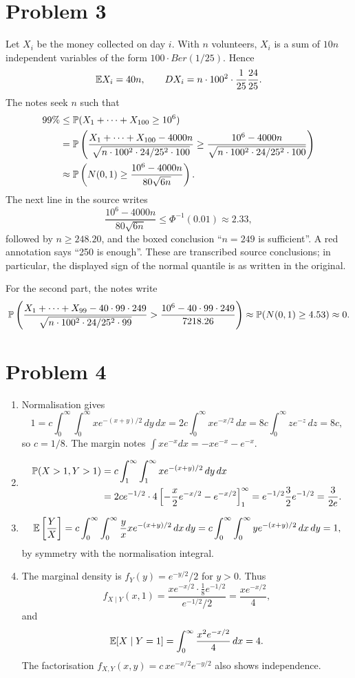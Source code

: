 \documentclass[a4paper]{article}
\begin{document}
\section*{Problem 3}
Let $X_i$ be the money collected on day $i$. With $n$ volunteers, $X_i$ is a sum of $10n$ independent variables of the form $100\cdot Ber(1/25)$. Hence
\[\E X_i=40n,\qquad DX_i=n\cdot100^2\cdot\frac1{25}\frac{24}{25}.\]
The notes seek $n$ such that
\begin{align*}
99\%&\le\P(X_1+\cdots+X_{100}\ge10^6)\\
&=\P\left(\frac{X_1+\cdots+X_{100}-4000n}{\sqrt{n\cdot100^2\cdot24/25^2\cdot100}}\ge\frac{10^6-4000n}{\sqrt{n\cdot100^2\cdot24/25^2\cdot100}}\right)\\
&\approx\P\left(N(0,1)\ge\frac{10^6-4000n}{80\sqrt{6n}}\right).
\end{align*}
The next line in the source writes
\[\frac{10^6-4000n}{80\sqrt{6n}}\le\Phi^{-1}(0.01)\approx2.33,\]
followed by $n\ge248.20$, and the boxed conclusion ``$n=249$ is sufficient''. A red annotation says ``250 is enough''. These are transcribed source conclusions; in particular, the displayed sign of the normal quantile is as written in the original.

For the second part, the notes write
\[\P\left(\frac{X_1+\cdots+X_{99}-40\cdot99\cdot249}{\sqrt{n\cdot100^2\cdot24/25^2\cdot99}}>\frac{10^6-40\cdot99\cdot249}{7218.26}\right)\approx\P(N(0,1)\ge4.53)\approx0.\]
\section*{Problem 4}
\begin{enumerate}
\item Normalisation gives
\[1=c\int_0^\infty\int_0^\infty xe^{-(x+y)/2}\,dy\,dx
=2c\int_0^\infty xe^{-x/2}\,dx=8c\int_0^\infty ze^{-z}\,dz=8c,\]
so $c=1/8$. The margin notes $\int xe^{-x}dx=-xe^{-x}-e^{-x}$.
\item
\begin{align*}
\P(X>1,Y>1)&=c\int_1^\infty\int_1^\infty xe^{-(x+y)/2}\,dy\,dx\\
&=2ce^{-1/2}\cdot4\left[-\frac x2e^{-x/2}-e^{-x/2}\right]_1^\infty
=e^{-1/2}\frac32e^{-1/2}=\frac3{2e}.
\end{align*}
\item
\[\E\left[\frac YX\right]=c\int_0^\infty\int_0^\infty\frac yx xe^{-(x+y)/2}\,dx\,dy
=c\int_0^\infty\int_0^\infty ye^{-(x+y)/2}\,dx\,dy=1,\]
by symmetry with the normalisation integral.
\item The marginal density is $f_Y(y)=e^{-y/2}/2$ for $y>0$. Thus
\[f_{X\mid Y}(x,1)=\frac{xe^{-x/2}\cdot\frac18e^{-1/2}}{e^{-1/2}/2}=\frac{xe^{-x/2}}4,\]
and
\[\E[X\mid Y=1]=\int_0^\infty\frac{x^2e^{-x/2}}4\,dx=4.\]
The factorisation $f_{X,Y}(x,y)=c\,xe^{-x/2}e^{-y/2}$ also shows independence.
\end{enumerate}
\end{document}
